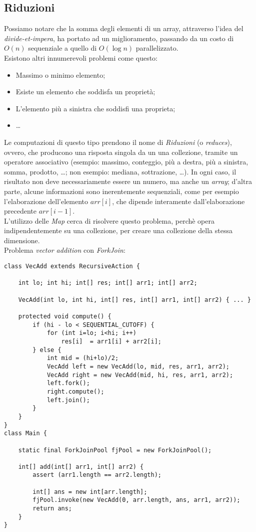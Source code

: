 \subsection{Riduzioni}
Possiamo notare che la somma degli elementi di un array, attraverso l'idea del \textit{divide-et-impera}, ha portato ad un miglioramento, passando da un costo di $O(n)$ sequenziale a quello di $O(\log{n})$ parallelizzato. \\
Esistono altri innumerevoli problemi come questo:
\begin{itemize}
	\item Massimo o minimo elemento;
	\item Esiste un elemento che soddisfa un proprietà;
	\item L'elemento più a sinistra che soddisfi una proprieta;
	\item \ldots
\end{itemize}
Le computazioni di questo tipo prendono il nome di \textit{Riduzioni} (o \textit{reduces}), ovvero, che producono una risposta singola da un una collezione, tramite un operatore associativo (esempio: massimo, conteggio, più a destra, più a sinistra, somma, prodotto, \ldots; non esempio: mediana, sottrazione, \ldots). In ogni caso, il risultato non deve necessariamente essere un numero, ma anche un \textit{array}; d'altra parte, alcune informazioni sono inerentemente sequenziali, come per esempio l'elaborazione dell'elemento $arr[i]$, che dipende interamente dall'elaborazione precedente $arr[i-1]$. \\
L'utilizzo delle \textit{Map} cerca di risolvere questo problema, perchè opera indipendentemente su una collezione, per creare una collezione della stessa dimensione. \\
Problema \textit{vector addition} con \textit{ForkJoin}:
\begin{lstlisting}
class VecAdd extends RecursiveAction {

	int lo; int hi; int[] res; int[] arr1; int[] arr2;

	VecAdd(int lo, int hi, int[] res, int[] arr1, int[] arr2) { ... }

	protected void compute() {
		if (hi - lo < SEQUENTIAL_CUTOFF) {
			for (int i=lo; i<hi; i++)
				res[i]  = arr1[i] + arr2[i];
		} else {
			int mid = (hi+lo)/2;
			VecAdd left = new VecAdd(lo, mid, res, arr1, arr2);
			VecAdd right = new VecAdd(mid, hi, res, arr1, arr2);
			left.fork();
			right.compute();
			left.join();
		}
	}
}
class Main {

	static final ForkJoinPool fjPool = new ForkJoinPool();

	int[] add(int[] arr1, int[] arr2) {
		assert (arr1.length == arr2.length);

		int[] ans = new int[arr.length];
		fjPool.invoke(new VecAdd(0, arr.length, ans, arr1, arr2));
		return ans;
	}
}
\end{lstlisting}

